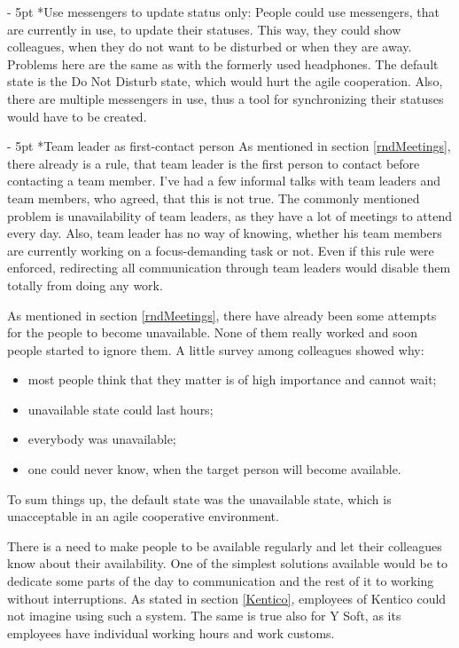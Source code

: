 \documentclass[11pt,singleside]{myfithesis2}
\makeatletter
\renewcommand\paragraph{
   \vspace{-10pt}
   \@startsection{paragraph}{4}{0mm}
      {\baselineskip}
      {- 5pt}
      {\normalfont\normalsize\bfseries}
}
\makeatother
\begin{document}
\paragraph*{Use messengers to update status only: } People could use messengers, that are currently in use, to update their statuses. This way, they could show colleagues, when they do not want to be disturbed or when they are away. Problems here are the same as with the formerly used headphones. The default state is the Do Not Disturb state, which would hurt the agile cooperation. Also, there are multiple messengers in use, thus a tool for synchronizing their statuses would have to be created.

\paragraph*{Team leader as first-contact person} As mentioned in section \ref{rndMeetings}, there already is a rule, that team leader is the first person to contact before contacting a team member. I've had a few informal talks with team leaders and team members, who agreed, that this is not true. The commonly mentioned problem is unavailability of team leaders, as they have a lot of meetings to attend every day. Also, team leader has no way of knowing, whether his team members are currently working on a focus-demanding task or not. Even if this rule were enforced, redirecting all communication through team leaders would disable them totally from doing any work.

As mentioned in section \ref{rndMeetings}, there have already been some attempts for the people to become unavailable. None of them really worked and soon people started to ignore them. A little survey among colleagues showed why:
\begin{itemize}
	\item most people think that they matter is of high importance and cannot wait;
	\item unavailable state could last hours;
	\item everybody was unavailable;
	\item one could never know, when the target person will become available.
\end{itemize}
To sum things up, the default state was the unavailable state, which is unacceptable in an agile cooperative environment.

There is a need to make people to be available regularly and let their colleagues know about their availability. One of the simplest solutions available would be to dedicate some parts of the day to communication and the rest of it to working without interruptions. As stated in section \ref{Kentico}, employees of Kentico could not imagine using such a system. The same is true also for Y Soft, as its employees have individual working hours and work customs. 
\end{document}

